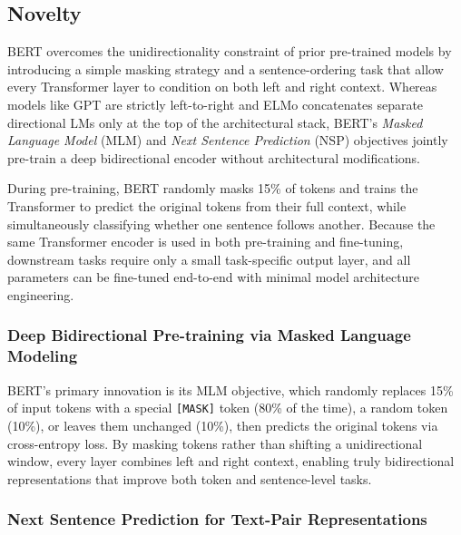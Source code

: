 \documentclass[10pt]{article}
\begin{document}
\subsection*{Novelty}

BERT overcomes the unidirectionality constraint of prior pre-trained models by introducing a simple masking strategy and a sentence-ordering task that allow every Transformer layer to condition on both left and right context. Whereas models like GPT are strictly left-to-right and ELMo concatenates separate directional LMs only at the top of the architectural stack, BERT's \textit{Masked Language Model} (MLM) and \textit{Next Sentence Prediction} (NSP) objectives jointly pre-train a deep bidirectional encoder without architectural modifications.

During pre-training, BERT randomly masks 15\% of tokens and trains the Transformer to predict the original tokens from their full context, while simultaneously classifying whether one sentence follows another. Because the same Transformer encoder is used in both pre-training and fine-tuning, downstream tasks require only a small task-specific output layer, and all parameters can be fine-tuned end-to-end with minimal model architecture engineering.

\subsubsection*{Deep Bidirectional Pre-training via Masked Language Modeling}

BERT's primary innovation is its MLM objective, which randomly replaces 15\% of input tokens with a special \texttt{[MASK]} token (80\% of the time), a random token (10\%), or leaves them unchanged (10\%), then predicts the original tokens via cross-entropy loss. By masking tokens rather than shifting a unidirectional window, every layer combines left and right context, enabling truly bidirectional representations that improve both token and sentence-level tasks.

\subsubsection*{Next Sentence Prediction for Text-Pair Representations}
\end{document}
